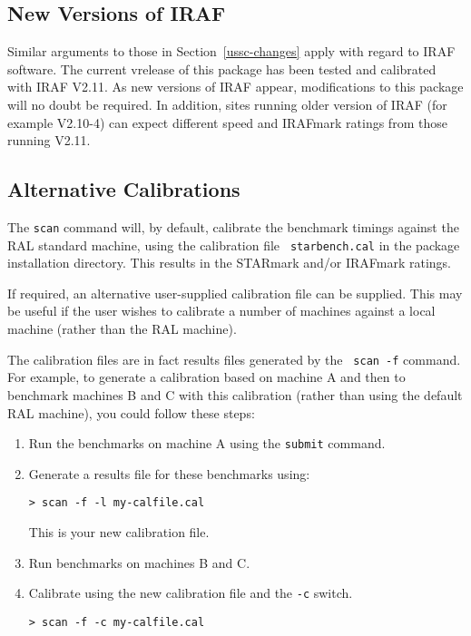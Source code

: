 \subsection{New Versions of IRAF}

Similar arguments to those in Section~\ref{ussc-changes} apply with
regard to IRAF software. The current v\pkgver release of this package has
been tested and calibrated with IRAF V2.11. As new versions of IRAF appear, 
modifications to this package will no doubt be required. In addition, sites
running older version of IRAF (for example V2.10-4) can expect different
speed and IRAFmark ratings from those running V2.11. 

\subsection{Alternative Calibrations}
\label{calfile}

The {\tt scan} command will, by default, calibrate the benchmark timings 
against the RAL standard machine, using the calibration file {\tt
starbench.cal} in the package installation directory. This results in
the STARmark and/or IRAFmark ratings.

If required, an alternative user-supplied calibration file can be
supplied. This may be useful if the user wishes to calibrate a 
number of machines against a local machine (rather than the RAL
machine). 

The calibration files are in fact results files generated by the {\tt
scan -f} command. For example, to generate a calibration based on
machine A and then to benchmark machines B and C with this calibration
(rather than using the default RAL machine), you could follow these
steps:

\begin{enumerate}
\item Run the benchmarks on machine A using the {\tt submit} command.
\item Generate a results file for these benchmarks using:

{\tt > scan -f -l my-calfile.cal}

This is your new calibration file.

\item Run benchmarks on machines B and C.
\item Calibrate using the new calibration file and the {\tt -c} switch.

{\tt > scan -f -c my-calfile.cal}
\end{enumerate}

